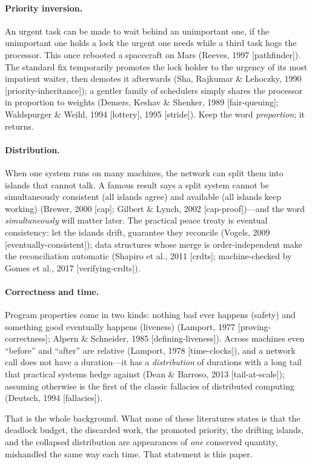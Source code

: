 \documentclass[11pt]{article}
\begin{document}
\paragraph{Priority inversion.} An urgent task can be made to wait
behind an unimportant one, if the unimportant one holds a lock the
urgent one needs while a third task hogs the processor. This once
rebooted a spacecraft on Mars (Reeves, 1997 [pathfinder]). The
standard fix temporarily promotes the lock holder to the urgency of
its most impatient waiter, then demotes it afterwards (Sha, Rajkumar
\& Lehoczky, 1990 [priority-inheritance]); a gentler family of
schedulers simply shares the processor in proportion to weights
(Demers, Keshav \& Shenker, 1989 [fair-queuing]; Waldspurger \&
Weihl, 1994 [lottery], 1995 [stride]). Keep the word
\emph{proportion}; it returns.

\paragraph{Distribution.} When one system runs on many machines, the
network can split them into islands that cannot talk. A famous result
says a split system cannot be simultaneously consistent (all islands
agree) and available (all islands keep working) (Brewer, 2000 [cap];
Gilbert \& Lynch, 2002 [cap-proof])---and the word
\emph{simultaneously} will matter later. The practical peace treaty
is eventual consistency: let the islands drift, guarantee they
reconcile (Vogels, 2009 [eventually-consistent]); data structures
whose merge is order-independent make the reconciliation automatic
(Shapiro et al., 2011 [crdts]; machine-checked by Gomes et al., 2017
[verifying-crdts]).

\paragraph{Correctness and time.} Program properties come in two
kinds: nothing bad ever happens (safety) and something good
eventually happens (liveness) (Lamport, 1977 [proving-correctness];
Alpern \& Schneider, 1985 [defining-liveness]). Across machines even
``before'' and ``after'' are relative (Lamport, 1978 [time-clocks]),
and a network call does not have a duration---it has a
\emph{distribution} of durations with a long tail that practical
systems hedge against (Dean \& Barroso, 2013 [tail-at-scale]);
assuming otherwise is the first of the classic fallacies of
distributed computing (Deutsch, 1994 [fallacies]).

That is the whole background. What none of these literatures states
is that the deadlock budget, the discarded work, the promoted
priority, the drifting islands, and the collapsed distribution are
appearances of \emph{one} conserved quantity, mishandled the same way
each time. That statement is this paper.
\end{document}

